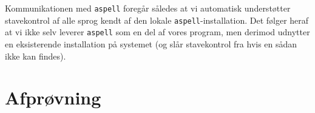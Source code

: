\documentclass[a4paper,oneside,article]{memoir}
\begin{document}
Kommunikationen med \texttt{aspell} foregår således at
vi automatisk understøtter stavekontrol af alle sprog kendt af den
lokale \texttt{aspell}-installation. Det følger heraf at vi ikke selv
leverer \texttt{aspell} som en del af vores program, men derimod
udnytter en eksisterende installation på systemet (og slår
stavekontrol fra hvis en sådan ikke kan findes).

\newpage
\chapter{Afprøvning}
\end{document}
